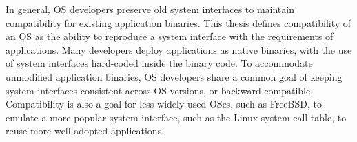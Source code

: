 


In general, OS developers preserve old system interfaces
to maintain compatibility for existing application binaries.
This thesis defines compatibility of an OS as 
the ability to reproduce a system interface with the requirements of applications.
Many developers deploy applications as native binaries,
with the use of system interfaces
hard-coded inside the binary code.
To accommodate unmodified application binaries,
OS developers share a common goal of keeping system interfaces
consistent across OS versions,
or backward-compatible.
Compatibility is also a goal for less widely-used OSes, such as FreeBSD,
to emulate a more popular system interface, such as the Linux system call table,
to reuse more well-adopted applications.


